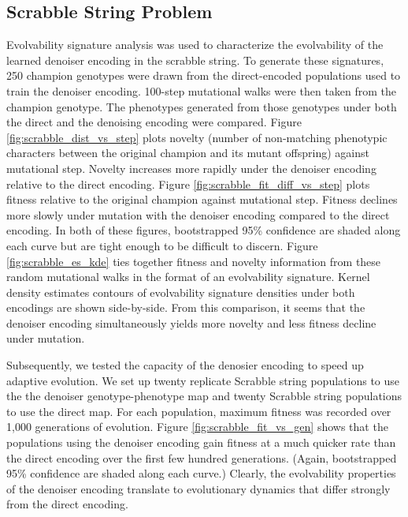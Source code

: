 \subsection{Scrabble String Problem}






Evolvability signature analysis was used to characterize the evolvability of the learned denoiser encoding in the scrabble string.
To generate these signatures, 250 champion genotypes were drawn from the direct-encoded populations used to train the denoiser encoding.
100-step mutational walks were then taken from the champion genotype.
The phenotypes generated from those genotypes under both the direct and the denoising encoding were compared.
Figure \ref{fig:scrabble_dist_vs_step} plots novelty (number of non-matching phenotypic characters between the original champion and its mutant offspring) against mutational step.
Novelty increases more rapidly under the denoiser encoding relative to the direct encoding.
Figure \ref{fig:scrabble_fit_diff_vs_step} plots fitness relative to the original champion against mutational step.
Fitness declines more slowly under mutation with the denoiser encoding compared to the direct encoding.
In both of these figures, bootstrapped 95\% confidence are shaded along each curve but are tight enough to be difficult to discern.
Figure \ref{fig:scrabble_es_kde} ties together fitness and novelty information from these random mutational walks in the format of an evolvability signature.
Kernel density estimates contours of evolvability signature densities under both encodings are shown side-by-side.
From this comparison, it seems that the denoiser encoding simultaneously yields more novelty and less fitness decline under mutation.

Subsequently, we tested the capacity of the denosier encoding to speed up adaptive evolution.
We set up twenty replicate Scrabble string populations to use the the denoiser genotype-phenotype map and twenty Scrabble string populations to use the direct map.
For each population, maximum fitness was recorded over 1,000 generations of evolution.
Figure \ref{fig:scrabble_fit_vs_gen} shows that the populations using the denoiser encoding gain fitness at a much quicker rate than the direct encoding over the first few hundred generations.
(Again, bootstrapped 95\% confidence are shaded along each curve.)
Clearly, the evolvability properties of the denoiser encoding translate to evolutionary dynamics that differ strongly from the direct encoding.

